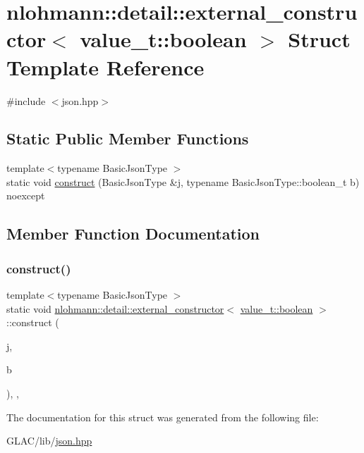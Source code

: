 \hypertarget{structnlohmann_1_1detail_1_1external__constructor_3_01value__t_1_1boolean_01_4}{}\section{nlohmann\+::detail\+::external\+\_\+constructor$<$ value\+\_\+t\+::boolean $>$ Struct Template Reference}
\label{structnlohmann_1_1detail_1_1external__constructor_3_01value__t_1_1boolean_01_4}


{\ttfamily \#include $<$json.\+hpp$>$}

\subsection*{Static Public Member Functions}
\begin{DoxyCompactItemize}
\item 
{\footnotesize template$<$typename Basic\+Json\+Type $>$ }\\static void \mbox{\hyperlink{structnlohmann_1_1detail_1_1external__constructor_3_01value__t_1_1boolean_01_4_a867122bcf0856c757bd6bcbfb8be74bc}{construct}} (Basic\+Json\+Type \&j, typename Basic\+Json\+Type\+::boolean\+\_\+t b) noexcept
\end{DoxyCompactItemize}


\subsection{Member Function Documentation}
\mbox{\label{structnlohmann_1_1detail_1_1external__constructor_3_01value__t_1_1boolean_01_4_a867122bcf0856c757bd6bcbfb8be74bc}} 
\subsubsection{\texorpdfstring{construct()}{construct()}}
{\footnotesize\ttfamily template$<$typename Basic\+Json\+Type $>$ \\
static void \mbox{\hyperlink{structnlohmann_1_1detail_1_1external__constructor}{nlohmann\+::detail\+::external\+\_\+constructor}}$<$ \mbox{\hyperlink{namespacenlohmann_1_1detail_a90aa5ef615aa8305e9ea20d8a947980fa84e2c64f38f78ba3ea5c905ab5a2da27}{value\+\_\+t\+::boolean}} $>$\+::construct (\begin{DoxyParamCaption}\item[{Basic\+Json\+Type \&}]{j,  }\item[{typename Basic\+Json\+Type\+::boolean\+\_\+t}]{b }\end{DoxyParamCaption})\hspace{0.3cm}{\ttfamily [inline]}, {\ttfamily [static]}, {\ttfamily [noexcept]}}



The documentation for this struct was generated from the following file\+:\begin{DoxyCompactItemize}
\item 
G\+L\+A\+C/lib/\mbox{\hyperlink{json_8hpp}{json.\+hpp}}\end{DoxyCompactItemize}
